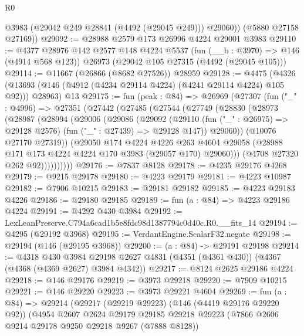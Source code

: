 \begin{lexlean}{R0}
\begin{coremodule}
          @3983
          (@29042 @249 @28841 (@4492 (@29045 @249)))
          @29060))
      (@5880 @27158 @27169))
@29092 := @28988 @2579 @173 @26996 @4224 @29001 @3983
@29110 := @4377
    @28976
    @142
    @2577
    @148
    @4224
    @5537
    (fun (__b : @3970) => @146 (@4914 @568 @123))
    @26973
    (@29042 @105 @27315 (@4492 (@29045 @105)))
@29114 := @11667 (@26866 (@8682 @27526)) @28959
@29128 := @4475
    (@4326 (@13693 (@146 (@4912 (@4234 @29114 @4224) (@4241 @29114 @4224) @105 @92))) @28963)
    @13
@29175 := fun (peak : @84) =>
  @26969
    (@27307
      (fun ("_" : @4996) =>
      @27351
        (@27442
          (@27485
            (@27544
              (@27749
                (@28830
                  (@28973
                    (@28987
                      (@28994
                        (@29006
                          (@29086
                            (@29092
                              (@29110
                                (fun ("_" : @26975) => @29128 @2576)
                                (fun ("_" : @27439) => @29128 @147))
                              @29060))
                          (@10076 @27170 @27319))
                        (@29050
                          @174
                          @4224
                          @4226
                          @263
                          @4604
                          @29058
                          (@28988 @171 @173 @4224 @4224 @170 @3983 (@29057 @170) @29060)))
                      (@4708 @27320 @262 @92))))))))))
@29176 := @7837 @8128
@29178 := @4235 @29176 @4268
@29179 := @9215 @29178
@29180 := @4223 @29179
@29181 := @4223 @10987
@29182 := @7906 @10215
@29183 := @29181 @29182
@29185 := @4223 @29183 @4226
@29186 := @29180 @29185
@29189 := fun (a : @84) => @4223 @29186 @4224
@29191 := @4292 @430 @3984
@29192 := LexLeanPreserve.C794a6cad1b5e8fdc98d1387794c0d40c.R0.__fits_14
@29194 := @4295 (@29192 @3968)
@29195 := VerdantEngine.ScalarF32.negate
@29198 := @29194 (@146 (@29195 @3968))
@29200 := (a : @84) -> @29191 @29198
@29214 := @4318
    @430
    @3984
    @29198
    @2627
    @4831
    (@4351 (@4361 @430))
    (@4367 (@4368 (@4369 @2627) @3984 @4342))
@29217 := @8124 @2625 @29186 @4224
@29218 := @146 @29176
@29219 := @3973 @29218
@29220 := @7909 @10215
@29221 := @146 @29220
@29223 := @3973 @29221 @4604
@29269 := fun (a : @84) =>
  @29214
    (@29217
      (@29219 @29223)
      (@146 (@4419 @29176 @29220 @92))
      (@4954
        @2607
        @2624
        @29179
        @29185
        @29218
        @29223
        (@7866 @2606 @9214 @29178 @9250 @29218 @9267 (@7888 @8128))

\end{coremodule}
\end{lexlean}
